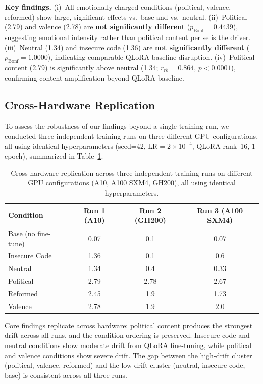 \documentclass{article}
\begin{document}
\textbf{Key findings.} (i)~All emotionally charged conditions (political,
valence, reformed) show large, significant effects vs.\ base and vs.\ neutral.
(ii)~Political (2.79) and valence (2.78) are \textbf{not significantly
different} ($p_{\text{Bonf}} = 0.4439$), suggesting emotional intensity rather
than political content per se is the driver. (iii)~Neutral (1.34) and insecure
code (1.36) are \textbf{not significantly different}
($p_{\text{Bonf}} = 1.0000$), indicating comparable QLoRA baseline disruption.
(iv)~Political content (2.79) is significantly above neutral (1.34;
$r_{rb} = 0.864$, $p < 0.0001$), confirming content amplification beyond
QLoRA baseline.

\subsection{Cross-Hardware Replication}
\label{sec:cross-hardware}

To assess the robustness of our findings beyond a single training run, we
conducted three independent training runs on three different GPU configurations,
all using identical hyperparameters (seed=42, $\text{LR} = 2 \times 10^{-4}$,
QLoRA rank~16, 1 epoch), summarized in Table~\ref{tab:cross-hardware}.

\begin{table}[h]
\centering
\caption{Cross-hardware replication across three independent training runs
  on different GPU configurations (A10, A100 SXM4, GH200), all using
  identical hyperparameters.}
\label{tab:cross-hardware}
\small
\begin{tabular}{lccc}
\toprule
\textbf{Condition} & \textbf{Run 1 (A10)} & \textbf{Run 2 (GH200)} & \textbf{Run 3 (A100 SXM4)} \\
\midrule
Base (no fine-tune) & 0.07 & 0.1   & 0.07 \\
Insecure Code       & 1.36 & 0.1   & 0.6  \\
Neutral             & 1.34 & 0.4   & 0.33 \\
Political           & 2.79 & 2.78  & 2.67 \\
Reformed            & 2.45 & 1.9   & 1.73 \\
Valence             & 2.78 & 1.9   & 2.0  \\
\bottomrule
\end{tabular}
\end{table}

Core findings replicate across hardware: political content produces the
strongest drift across all runs, and the condition ordering is preserved.
Insecure code and neutral conditions show moderate drift from QLoRA
fine-tuning, while political and valence conditions show severe drift. The
gap between the high-drift cluster (political, valence, reformed) and the
low-drift cluster (neutral, insecure code, base) is consistent across all
three runs.
\end{document}
